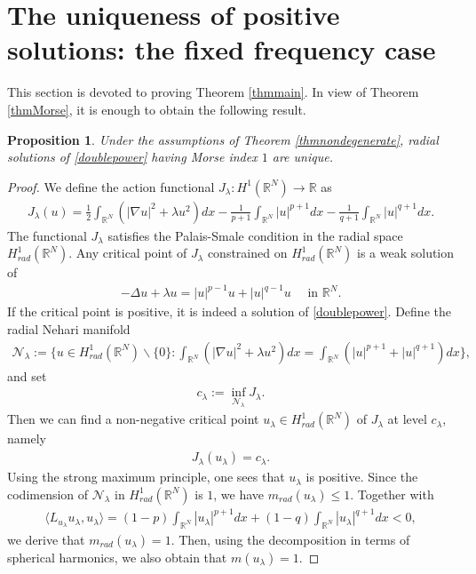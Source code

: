 \documentclass{article}
\newtheorem{proposition}[theorem]{Proposition}
\theoremstyle{definition} \theoremstyle{remark}
\numberwithin{equation}{section}
\newcommand{\R}{\mathbb{R}}
\newcommand{\la}{\lambda}
\begin{document}
	\section{The uniqueness of positive solutions: the fixed frequency case} \label{secuniqueness1}

	This section is devoted to proving Theorem \ref{thmmain}. In view of Theorem \ref{thmMorse}, it is enough to obtain the following result.

	\begin{proposition} \label{propweakunique}
		Under the assumptions of Theorem \ref{thmnondegenerate}, radial solutions of \eqref{doublepower} having Morse index $1$ are unique.
	\end{proposition}

	\begin{proof}
		We define the action functional $J_\la : H^1(\R^N) \to \R$ as
		\begin{align*}
			J_\la(u) = \frac{1}{2}\int_{\R^N}\left(|\nabla u|^2 + \la u^2\right)dx - \frac{1}{p+1}\int_{\R^N}|u|^{p+1}dx - \frac{1}{q+1}\int_{\R^N}|u|^{q+1}dx.
		\end{align*}
		The functional $J_\la$ satisfies the Palais-Smale condition in the radial space $H_{rad}^1(\R^N)$. Any critical point of $J_\la$ constrained on $H_{rad}^1(\R^N)$ is a weak solution of
		\begin{align} \label{eqofweaksolution}
			-\Delta u + \la u = |u|^{p-1}u + |u|^{q-1}u \quad \text{ in } \R^N.
		\end{align}
		If the critical point is positive, it is indeed a solution of \eqref{doublepower}. Define the radial Nehari manifold
		\begin{align*}
			\mathcal{N}_\la := \big\{u \in H_{rad}^1(\R^N) \backslash \{0\}: \int_{\R^N}\left(|\nabla u|^2 + \la u^2\right)dx = \int_{\R^N}(|u|^{p+1} + |u|^{q+1})dx \big\},
		\end{align*}
		and set
		\begin{align*}
			c_\la := \inf_{\mathcal{N}_\la}J_\la.
		\end{align*}
		Then we can find a non-negative critical point $u_\la \in H_{rad}^1(\R^N)$ of $J_\la$ at level $c_\la$, namely
		\begin{align*}
			J_\la(u_\la) = c_\la.
		\end{align*}
		Using the strong maximum principle, one sees that $u_\la$ is positive. Since the codimension of $\mathcal{N}_\la$ in $H_{rad}^1(\R^N)$ is $1$, we have $m_{rad}(u_\la) \le 1$. Together with
		\begin{align*}
			\langle L_{u_\la}u_\la,u_\la \rangle =(1-p)\int_{\R^N}|u_\la|^{p+1}dx + (1-q)\int_{\R^N}|u_\la|^{q+1}dx < 0,
		\end{align*}
		we derive that $m_{rad}(u_\la) = 1$. Then, using the decomposition in terms of spherical harmonics, we also obtain that $m(u_\la) = 1$.


\end{proof}
\end{document}
